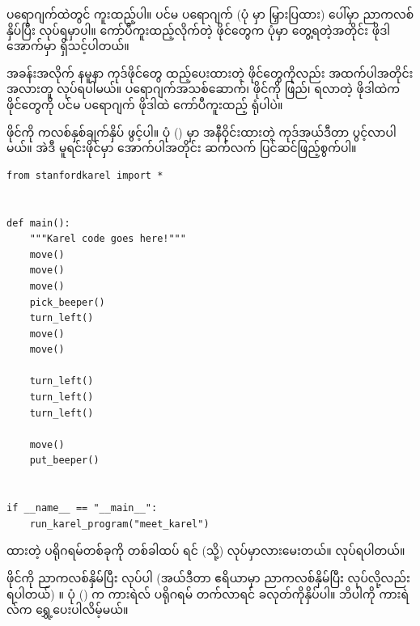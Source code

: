  ပရောဂျက်ထဲတွင် ကူးထည့်ပါ။ ပင်မ ပရောဂျက်  (ပုံ \fRefNo{\ref{fig:edit_meet_karel}} မှာ မြှားပြထား) ပေါ်မှာ ညာကလစ်နှိပ်ပြီး  လုပ်ရမှာပါ။ ကော်ပီကူးထည့်လိုက်တဲ့ ဖိုင်တွေက ပုံမှာ တွေ့ရတဲ့အတိုင်း   ဖိုဒါအောက်မှာ ရှိသင့်ပါတယ်။

\begin{mytcbox}
အခန်းအလိုက် နမူနာ ကုဒ်ဖိုင်တွေ ထည့်ပေးထားတဲ့  ဖိုင်တွေကိုလည်း အထက်ပါအတိုင်း အလားတူ လုပ်ရပါမယ်။ ပရောဂျက်အသစ်ဆောက်၊  ဖိုင်ကို ဖြည်၊ ရလာတဲ့ ဖိုဒါထဲက ဖိုင်တွေကို ပင်မ ပရောဂျက် ဖိုဒါထဲ ကော်ပီကူးထည့် ရုံပါပဲ။
\end{mytcbox}

 ဖိုင်ကို ကလစ်နှစ်ချက်နှိပ် ဖွင့်ပါ။ ပုံ (\fRefNo{\ref{fig:edit_meet_karel}}) မှာ အနီဝိုင်းထားတဲ့  ကုဒ်အယ်ဒီတာ  ပွင့်လာပါမယ်။ အဲဒီ မူရင်းဖိုင်မှာ အောက်ပါအတိုင်း ဆက်လက် ပြင်ဆင်ဖြည့်စွက်ပါ။
%
\setlength{\fboxsep}{0pt}
\label{lst:mtkrl}
\begin{verbatim}
from stanfordkarel import *


def main():
    """Karel code goes here!"""
    move()
    move()
    move()
    pick_beeper()
    turn_left()
    move()
    move()

    turn_left()
    turn_left()
    turn_left()

    move()
    put_beeper()


if __name__ == "__main__":
    run_karel_program("meet_karel")
\end{verbatim}
%



\begin{mytcbox}
 ထားတဲ့ ပရိုဂရမ်တစ်ခုကို တစ်ခါထပ်  ရင်  (သို့)  လုပ်မှာလားမေးတယ်။  လုပ်ရပါတယ်။
\end{mytcbox}

 ဖိုင်ကို ညာကလစ်နှိမ်ပြီး  လုပ်ပါ (အယ်ဒီတာ ဧရိယာမှာ ညာကလစ်နှိမ်ပြီး  လုပ်လို့လည်း ရပါတယ်) ။ ပုံ (\fRefNo{\ref{fig:mtkrlpgm}}) က ကားရဲလ် ပရိုဂရမ် တက်လာရင်  ခလုတ်ကိုနှိပ်ပါ။ ဘိပါကို ကားရဲလ်က ရွှေ့ပေးပါလိမ့်မယ်။

